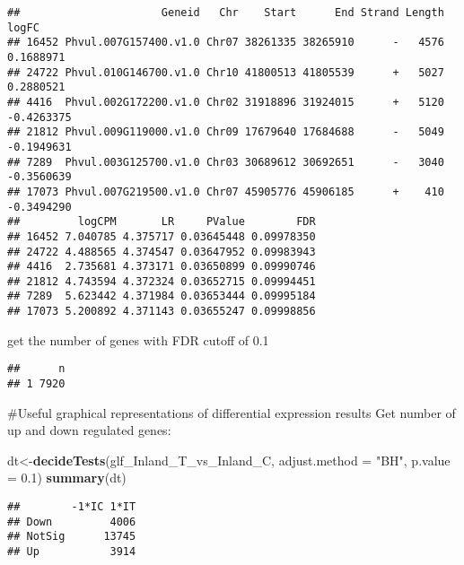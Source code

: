 \documentclass[
]{article}
\newenvironment{Shaded}{\begin{snugshade}}{\end{snugshade}}
\newcommand{\DataTypeTok}[1]{\textcolor[rgb]{0.13,0.29,0.53}{#1}}
\newcommand{\FloatTok}[1]{\textcolor[rgb]{0.00,0.00,0.81}{#1}}
\newcommand{\KeywordTok}[1]{\textcolor[rgb]{0.13,0.29,0.53}{\textbf{#1}}}
\newcommand{\NormalTok}[1]{#1}
\newcommand{\OperatorTok}[1]{\textcolor[rgb]{0.81,0.36,0.00}{\textbf{#1}}}
\newcommand{\StringTok}[1]{\textcolor[rgb]{0.31,0.60,0.02}{#1}}
\begin{document}
\begin{verbatim}
##                      Geneid   Chr    Start      End Strand Length      logFC
## 16452 Phvul.007G157400.v1.0 Chr07 38261335 38265910      -   4576  0.1688971
## 24722 Phvul.010G146700.v1.0 Chr10 41800513 41805539      +   5027  0.2880521
## 4416  Phvul.002G172200.v1.0 Chr02 31918896 31924015      +   5120 -0.4263375
## 21812 Phvul.009G119000.v1.0 Chr09 17679640 17684688      -   5049 -0.1949631
## 7289  Phvul.003G125700.v1.0 Chr03 30689612 30692651      -   3040 -0.3560639
## 17073 Phvul.007G219500.v1.0 Chr07 45905776 45906185      +    410 -0.3494290
##         logCPM       LR     PValue        FDR
## 16452 7.040785 4.375717 0.03645448 0.09978350
## 24722 4.488565 4.374547 0.03647952 0.09983943
## 4416  2.735681 4.373171 0.03650899 0.09990746
## 21812 4.743594 4.372324 0.03652715 0.09994451
## 7289  5.623442 4.371984 0.03653444 0.09995184
## 17073 5.200892 4.371143 0.03655247 0.09998856
\end{verbatim}

get the number of genes with FDR cutoff of 0.1

\begin{Shaded}
\end{Shaded}

\begin{verbatim}
##      n
## 1 7920
\end{verbatim}

\#Useful graphical representations of differential expression results
Get number of up and down regulated genes:

\begin{Shaded}
\begin{Highlighting}[]
\NormalTok{dt<-}\KeywordTok{decideTests}\NormalTok{(glf_Inland_T_vs_Inland_C, }\DataTypeTok{adjust.method =} \StringTok{"BH"}\NormalTok{, }\DataTypeTok{p.value =} \FloatTok{0.1}\NormalTok{)}
\KeywordTok{summary}\NormalTok{(dt)}
\end{Highlighting}
\end{Shaded}

\begin{verbatim}
##        -1*IC 1*IT
## Down         4006
## NotSig      13745
## Up           3914
\end{verbatim}
\end{document}

